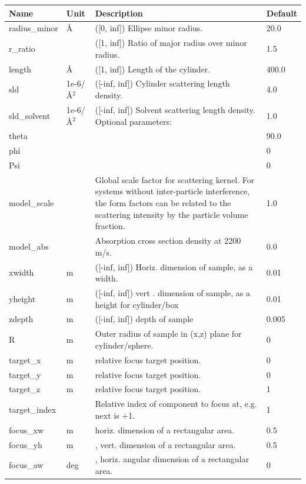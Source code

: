 \begin{longtable}{p{}p{}p{}p{}}
\toprule
\textbf{Name} & \textbf{Unit} & \textbf{Description} & \textbf{Default} \\
\midrule
\endhead
radius\_minor & \AA{} & ([0, inf]) Ellipse minor radius. & 20.0 \\
r\_ratio &  & ([1, inf]) Ratio of major radius over minor radius. & 1.5 \\
length & \AA{} & ([1, inf]) Length of the cylinder. & 400.0 \\
sld & 1e-6/\AA{}$^{2}$ & ([-inf, inf]) Cylinder scattering length density. & 4.0 \\
sld\_solvent & 1e-6/\AA{}$^{2}$ & ([-inf, inf]) Solvent scattering length density. Optional parameters: & 1.0 \\
theta &  &  & 90.0 \\
phi &  &  & 0 \\
Psi &  &  & 0 \\
model\_scale &   & Global scale factor for scattering kernel. For systems without inter-particle interference, the form factors can be related to the scattering intensity by the particle volume fraction. & 1.0 \\
model\_abs &   & Absorption cross section density at 2200 m/s. & 0.0 \\
xwidth & m & ([-inf, inf]) Horiz. dimension of sample, as a width. & 0.01 \\
yheight & m & ([-inf, inf]) vert . dimension of sample, as a height for cylinder/box & 0.01 \\
zdepth & m & ([-inf, inf]) depth of sample & 0.005 \\
R & m & Outer radius of sample in (x,z) plane for cylinder/sphere. & 0 \\
target\_x & m & relative focus target position. & 0 \\
target\_y & m & relative focus target position. & 0 \\
target\_z & m & relative focus target position. & 1 \\
target\_index &   & Relative index of component to focus at, e.g. next is +1. & 1 \\
focus\_xw & m & horiz. dimension of a rectangular area. & 0.5 \\
focus\_yh & m & , vert. dimension of a rectangular area. & 0.5 \\
focus\_aw & deg & , horiz. angular dimension of a rectangular area. & 0 \\

\end{longtable}
